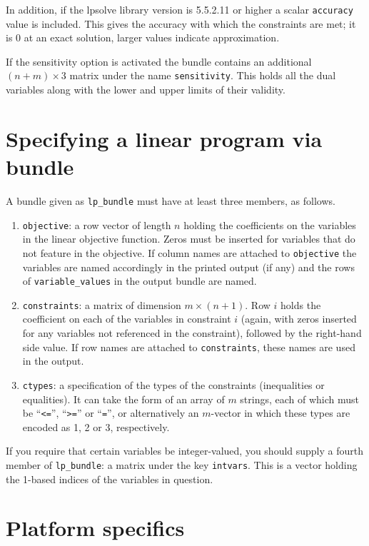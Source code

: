 \documentclass{article}
\begin{document}
In addition, if the \textsf{lpsolve} library version is 5.5.2.11 or
higher a scalar \texttt{accuracy} value is included. This gives the
accuracy with which the constraints are met; it is 0 at an exact
solution, larger values indicate approximation.

If the sensitivity option is activated the bundle contains an
additional $(n+m) \times 3$ matrix under the name
\texttt{sensitivity}. This holds all the dual variables along with the
lower and upper limits of their validity.

\section{Specifying a linear program via bundle}
\label{sec:lp-bundle}

A bundle given as \texttt{lp\_bundle} must have at least three
members, as follows.
\begin{enumerate}
\item \texttt{objective}: a row vector of length $n$ holding the
  coefficients on the variables in the linear objective
  function. Zeros must be inserted for variables that do not feature
  in the objective. If column names are attached to
  \texttt{objective} the variables are named accordingly in the
  printed output (if any) and the rows of \texttt{variable\_values}
  in the output bundle are named.
\item \texttt{constraints}: a matrix of dimension $m \times
  (n+1)$. Row $i$ holds the coefficient on each of the variables in
  constraint $i$ (again, with zeros inserted for any variables not
  referenced in the constraint), followed by the right-hand side
  value. If row names are attached to \texttt{constraints}, these
  names are used in the output.
\item \texttt{ctypes}: a specification of the types of the constraints
  (inequalities or equalities). It can take the form of an array of
  $m$ strings, each of which must be ``\texttt{<=}'', ``\texttt{>=}''
  or ``\texttt{=}'', or alternatively an $m$-vector in which these
  types are encoded as 1, 2 or 3, respectively.
\end{enumerate}

If you require that certain variables be integer-valued, you should
supply a fourth member of \texttt{lp\_bundle}: a matrix under the key
\texttt{intvars}. This is a vector holding the 1-based indices of the
variables in question.

\section{Platform specifics}
\label{sec:platforms}
\end{document}
